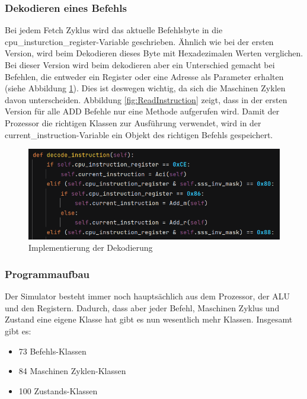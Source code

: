 \documentclass[12pt]{article}
\newcommand{\imgSpaceBefore}{\vspace{10pt}}
\begin{document}
\subsubsection{Dekodieren eines Befehls}
Bei jedem Fetch Zyklus wird das aktuelle Befehlsbyte in die cpu\_insturction\_register-Variable geschrieben. Ähnlich wie bei der ersten Version, wird beim Dekodieren dieses Byte mit Hexadezimalen Werten verglichen. Bei dieser Version wird beim dekodieren aber ein Unterschied gemacht bei Befehlen, die entweder ein Register oder eine Adresse als Parameter erhalten (siehe Abbildung \ref{fig:Decode_instr}). Dies ist deswegen wichtig, da sich die Maschinen Zyklen davon unterscheiden. Abbildung \ref{fig:ReadInstruction}  zeigt, dass in der ersten Version für alle ADD Befehle nur eine Methode aufgerufen wird. Damit der Prozessor die richtigen Klassen zur Ausführung verwendet, wird in der current\_instruction-Variable ein Objekt des richtigen Befehls gespeichert.

\imgSpaceBefore
\begin{figure}[H]
\centering
\includegraphics[width=15cm]{bilder/DecodeInstruction}
\caption{Implementierung der Dekodierung}
\label{fig:Decode_instr}
\end{figure}

\subsubsection{Programmaufbau}

Der Simulator besteht immer noch hauptsächlich aus dem Prozessor, der ALU und den Registern. Dadurch, dass aber jeder Befehl, Maschinen Zyklus und Zustand eine eigene Klasse  hat gibt es nun wesentlich mehr Klassen. Insgesamt gibt es:

\begin{itemize}
\item 73 Befehls-Klassen
\item 84 Maschinen Zyklen-Klassen
\item 100 Zustands-Klassen
\end{itemize}
\end{document}

